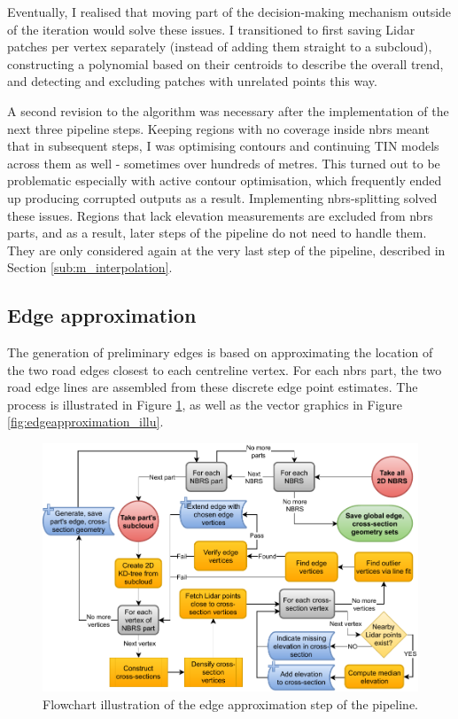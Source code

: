 Eventually, I realised that moving part of the decision-making mechanism outside of the iteration would solve these issues. I transitioned to first saving Lidar patches per vertex separately (instead of adding them straight to a subcloud), constructing a polynomial based on their centroids to describe the overall trend, and detecting and excluding patches with unrelated points this way.

A second revision to the algorithm was necessary after the implementation of the next three pipeline steps. Keeping regions with no coverage inside \ac{nbrs} meant that in subsequent steps, I was optimising contours and continuing \ac{TIN} models across them as well - sometimes over hundreds of metres. This turned out to be problematic especially with active contour optimisation, which frequently ended up producing corrupted outputs as a result. Implementing \ac{nbrs}-splitting solved these issues. Regions that lack elevation measurements are excluded from \ac{nbrs} parts, and as a result, later steps of the pipeline do not need to handle them. They are only considered again at the very last step of the pipeline, described in Section \ref{sub:m_interpolation}.

\subsection{Edge approximation}
\label{sub:m_edgeapproximation}

The generation of preliminary edges is based on approximating the location of the two road edges closest to each centreline vertex. For each \ac{nbrs} part, the two road edge lines are assembled from these discrete edge point estimates. The process is illustrated in Figure \ref{fig:edgeapproximationflow}, as well as the vector graphics in Figure \ref{fig:edgeapproximation_illu}.

\begin{figure}
    \centering
    \includegraphics[width=\linewidth]{final_report/figs/edge_estimation.pdf}
    \caption[Flowchart illustrating of the edge approximation step]{Flowchart illustration of the edge approximation step of the pipeline.}
    \label{fig:edgeapproximationflow}
\end{figure}

